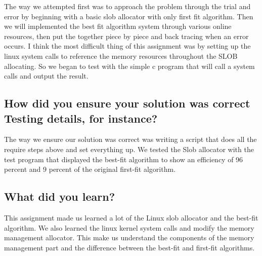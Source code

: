 \documentclass[onecolumn, draftclsnofoot, 10pt, titlepage, compsoc]{IEEEtran}
\begin{document}
The way we attempted first was to approach the problem through the trial and error by beginning with a basic slob allocator with only first fit algorithm. Then we will implemented the best fit algorithm system through various online resources, then put the together piece by piece and back tracing when an error occurs. I think the most difficult thing of this assignment was by setting up the linux system calls to reference the memory resources throughout the SLOB allocating. So we began to test with the simple c program that will call a system calls and output the result.\\

\subsection{How did you ensure your solution was correct Testing details, for instance?}

The way we ensure our solution was correct was writing a script that does all the require steps above and set everything up. We tested the Slob allocator with the test program that displayed the best-fit algorithm to show an efficiency of 96 percent and 9 percent of the original first-fit algorithm.\\

\subsection{What did you learn?} 

This assignment made us learned a lot of the Linux slob allocator and the best-fit algorithm. We also learned the linux kernel system calls and modify the memory management allocator. This make us understand the components of the memory management part and the difference between the best-fit and first-fit algorithms.\\

\nocite{*}


\end{document}
